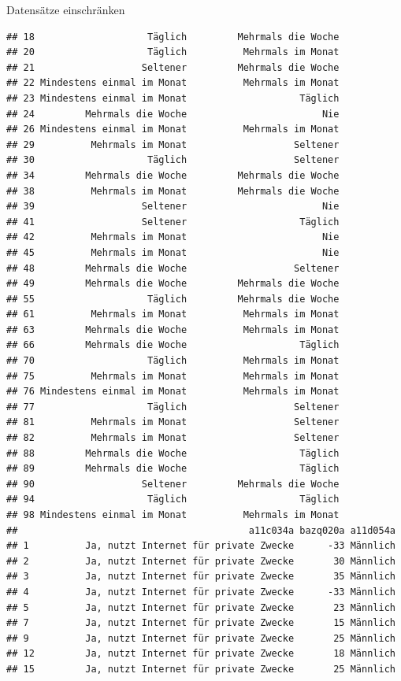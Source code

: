\documentclass[ignorenonframetext,]{beamer}
\begin{document}
\begin{frame}[fragile]{Datensätze einschränken}
\begin{verbatim}
## 18                    Täglich         Mehrmals die Woche
## 20                    Täglich          Mehrmals im Monat
## 21                   Seltener         Mehrmals die Woche
## 22 Mindestens einmal im Monat          Mehrmals im Monat
## 23 Mindestens einmal im Monat                    Täglich
## 24         Mehrmals die Woche                        Nie
## 26 Mindestens einmal im Monat          Mehrmals im Monat
## 29          Mehrmals im Monat                   Seltener
## 30                    Täglich                   Seltener
## 34         Mehrmals die Woche         Mehrmals die Woche
## 38          Mehrmals im Monat         Mehrmals die Woche
## 39                   Seltener                        Nie
## 41                   Seltener                    Täglich
## 42          Mehrmals im Monat                        Nie
## 45          Mehrmals im Monat                        Nie
## 48         Mehrmals die Woche                   Seltener
## 49         Mehrmals die Woche         Mehrmals die Woche
## 55                    Täglich         Mehrmals die Woche
## 61          Mehrmals im Monat          Mehrmals im Monat
## 63         Mehrmals die Woche          Mehrmals im Monat
## 66         Mehrmals die Woche                    Täglich
## 70                    Täglich          Mehrmals im Monat
## 75          Mehrmals im Monat          Mehrmals im Monat
## 76 Mindestens einmal im Monat          Mehrmals im Monat
## 77                    Täglich                   Seltener
## 81          Mehrmals im Monat                   Seltener
## 82          Mehrmals im Monat                   Seltener
## 88         Mehrmals die Woche                    Täglich
## 89         Mehrmals die Woche                    Täglich
## 90                   Seltener         Mehrmals die Woche
## 94                    Täglich                    Täglich
## 98 Mindestens einmal im Monat          Mehrmals im Monat
##                                         a11c034a bazq020a a11d054a
## 1          Ja, nutzt Internet für private Zwecke      -33 Männlich
## 2          Ja, nutzt Internet für private Zwecke       30 Männlich
## 3          Ja, nutzt Internet für private Zwecke       35 Männlich
## 4          Ja, nutzt Internet für private Zwecke      -33 Männlich
## 5          Ja, nutzt Internet für private Zwecke       23 Männlich
## 7          Ja, nutzt Internet für private Zwecke       15 Männlich
## 9          Ja, nutzt Internet für private Zwecke       25 Männlich
## 12         Ja, nutzt Internet für private Zwecke       18 Männlich
## 15         Ja, nutzt Internet für private Zwecke       25 Männlich

\end{verbatim}
\end{frame}
\end{document}
